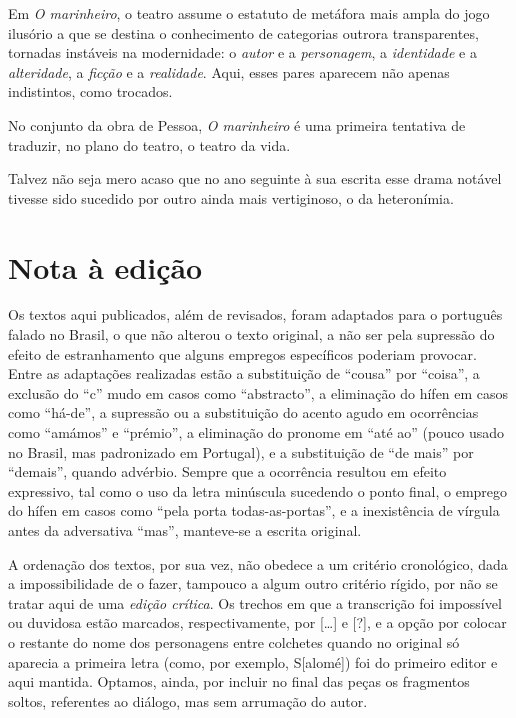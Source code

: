 Em \textit{O
marinheiro}, o teatro assume o estatuto de metáfora
mais ampla do jogo ilusório a que se destina o conhecimento de
categorias outrora transparentes, tornadas instáveis na modernidade: o
\textit{autor} e a
\textit{personagem}, a
\textit{identidade} e a
\textit{alteridade}, a
\textit{ficção} e a
\textit{realidade}. Aqui, esses
pares aparecem não apenas indistintos, como trocados. 

No conjunto da obra de Pessoa, \textit{O marinheiro} 
é uma primeira
tentativa de traduzir, no plano do teatro, o teatro da vida. 

Talvez não seja mero acaso que no ano seguinte à sua escrita esse drama
notável tivesse sido sucedido por outro ainda mais vertiginoso, o da
heteronímia.

\section{Nota à edição}

Os textos aqui publicados, além de revisados, foram adaptados para o
português falado no Brasil, o que não alterou o texto original, a não
ser pela supressão do efeito de estranhamento que alguns empregos
específicos poderiam provocar. Entre as adaptações realizadas
estão a substituição de “cousa” por “coisa”, a exclusão do “c” mudo em
casos como “abstracto”, a eliminação do hífen em casos como “há-de”, a
supressão ou a substituição do acento agudo em ocorrências como
“amámos” e “prémio”, a eliminação do pronome em “até ao” (pouco usado
no Brasil, mas padronizado em Portugal), e a substituição de “de mais”
por “demais”, quando advérbio. Sempre que a ocorrência resultou em
efeito expressivo, tal como o uso da letra minúscula sucedendo o ponto
final, o emprego do hífen em casos como “pela porta todas-as-portas”, e
a inexistência de vírgula antes da adversativa “mas”, manteve-se a
escrita original. 

A ordenação dos textos, por sua vez, não obedece a
um critério cronológico, dada a impossibilidade de o fazer, tampouco a
algum outro critério rígido, por não se tratar aqui de uma
\textit{edição crítica}. Os trechos em que a transcrição foi impossível
ou duvidosa estão marcados, respectivamente, por [\ldots] e [?], e 
a opção por colocar o restante do nome dos personagens entre colchetes 
quando no original só aparecia a primeira letra (como, por exemplo, S[alomé])
foi do primeiro editor e aqui mantida. Optamos,
ainda, por incluir no final das peças os fragmentos soltos, referentes
ao diálogo, mas sem arrumação do autor. 



